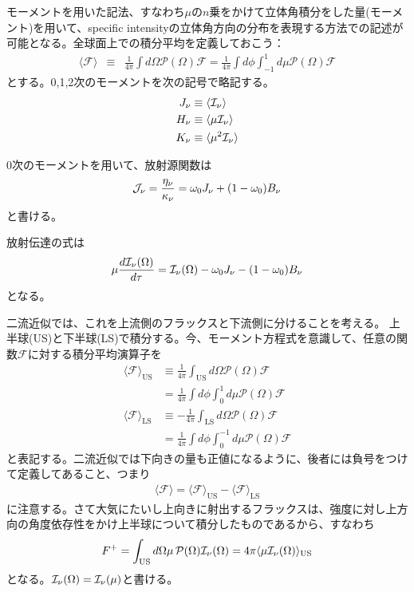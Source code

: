 モーメントを用いた記法、すなわち$\mu$の$n$乗をかけて立体角積分をした量(モーメント)を用いて、specific intensityの立体角方向の分布を表現する方法での記述が可能となる。全球面上での積分平均を定義しておこう：
\begin{align}
\label{eq:all_int}
  \langle\mathcal{F} \rangle&\equiv&  \frac{1}{4 \pi} \int d \Omega \mathcal{P} (\Omega ) \mathcal{F}  =  \frac{1}{4 \pi}  \int d \phi \int_{-1}^{1} d \mu \mathcal{P} (\Omega ) \mathcal{F} 
\end{align}
とする。0,1,2次のモーメントを次の記号で略記する。
\begin{align}
{J_\nu} &\equiv \langle{\mathcal{I}_\nu} \rangle\\
{H_\nu} &\equiv \langle\mu {\mathcal{I}_\nu} \rangle\\
{K_\nu} &\equiv \langle\mu^2 {\mathcal{I}_\nu} \rangle
\end{align}

0次のモーメントを用いて、放射源関数は
\begin{align}
{\mathcal{J}_\nu}  = \frac{\eta_\nu}{\kappa_\nu} =  \omega_0 J_\nu + (1 - \omega_0) B_\nu 
\label{eq:sourcef}
\end{align}
と書ける。

放射伝達の式は
\begin{align}
\label{eq:rtbasic}
\mu \frac{d {\mathcal{I}_\nu} (\Omega)}{d \tau} =  {\mathcal{I}_\nu} (\Omega)  -   \omega_0 J_\nu - (1 - \omega_0) B_\nu 
\end{align}
となる。



二流近似では、これを上流側のフラックスと下流側に分けることを考える。
上半球(US)と下半球(LS)で積分する。今、モーメント方程式を意識して、任意の関数$\mathcal{F}$に対する積分平均演算子を
\begin{align}
\label{eq:us_int}
  \langle\mathcal{F} \rangle_\mathrm{US} &\equiv \frac{1}{4 \pi} \int_{\mathrm{US}} d \Omega \mathcal{P} (\Omega ) \mathcal{F}  \nonumber \\
  &=  \frac{1}{4 \pi}  \int d \phi \int_{0}^{1} d \mu \mathcal{P} (\Omega ) \mathcal{F} \\
\label{eq:ls_int}
  \langle\mathcal{F} \rangle_\mathrm{LS} &\equiv - \frac{1}{4 \pi}  \int_{\mathrm{LS}} d \Omega \mathcal{P} (\Omega ) \mathcal{F}  \nonumber \\
  &=  \frac{1}{4 \pi}  \int d \phi \int_{0}^{-1} d \mu \mathcal{P} (\Omega) \mathcal{F}   
\end{align}
と表記する。二流近似では下向きの量も正値になるように、後者には負号をつけて定義してあること、つまり
\begin{align}
\langle\mathcal{F} \rangle = \langle\mathcal{F} \rangle_\mathrm{US} - \langle\mathcal{F} \rangle_\mathrm{LS}
\end{align}
に注意する。さて大気にたいし上向きに射出するフラックスは、強度に対し上方向の角度依存性をかけ上半球について積分したものであるから、すなわち
\begin{align}
F^+ = \int_\mathrm{US} d \Omega \mu \, \mathcal{P} (\Omega ) {\mathcal{I}_\nu} (\Omega) = 4 \pi   \langle \mu {\mathcal{I}_\nu} (\Omega)  \rangle_\mathrm{US}
\end{align}
となる。${\mathcal{I}_\nu} (\Omega)={\mathcal{I}_\nu} (\mu)$と書ける。

